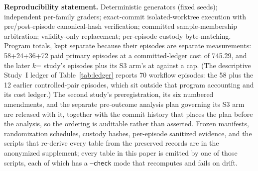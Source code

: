 \documentclass{article}
\begin{document}
\noindent\textbf{Reproducibility statement.} Deterministic generators (fixed seeds); independent per-family graders; exact-commit isolated-worktree execution with pre/post-episode canonical-hash verification; committed sample-membership arbitration; validity-only replacement; per-episode custody byte-matching. Program totals, kept separate because their episodes are separate measurements: 58+24+36+72 paid primary episodes at a committed-ledger cost of \textyen{}745.29, and the later $k$=\StatEightAK{} study's \StatEightAEpisodes{} episodes plus its S3 arm's \StatArmTwoEpisodes{} at \textyen{}\StatEightAProgramme{} against a \textyen{}\StatEightACap{} cap. (The descriptive Study~I ledger of Table~\ref{tab:ledger} reports 70 workflow episodes: the 58 plus the 12 earlier controlled-pair episodes, which sit outside that program accounting and its cost ledger.) The second study's preregistration, its six numbered amendments, and the separate pre-outcome analysis plan governing its S3 arm are released with it, together with the commit history that places the plan before the analysis, so the ordering is auditable rather than asserted. Frozen manifests, randomization schedules, custody hashes, per-episode sanitized evidence, and the scripts that re-derive every table from the preserved records are in the anonymized supplement; every table in this paper is emitted by one of those scripts, each of which has a \texttt{--check} mode that recomputes and fails on drift.
\end{document}
